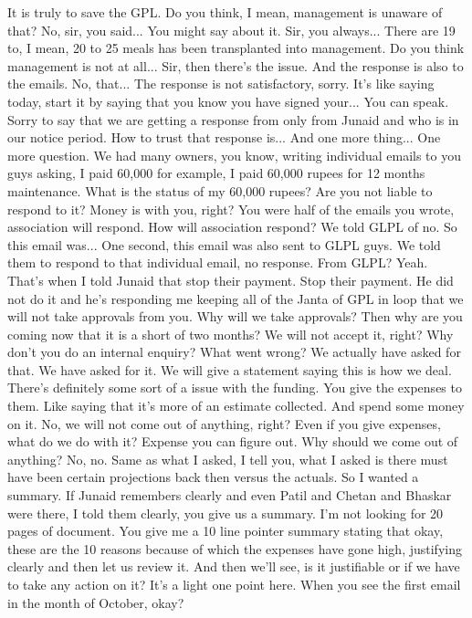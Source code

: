 It is truly to save the GPL.
Do you think, I mean, management is unaware of that?
No, sir, you said...
You might say about it.
Sir, you always...
There are 19 to, I mean, 20 to 25 meals has been transplanted into management.
Do you think management is not at all...
Sir, then there's the issue.
And the response is also to the emails.
No, that...
The response is not satisfactory, sorry.
It's like saying today, start it by saying that you know you have signed your...
You can speak.
Sorry to say that we are getting a response from only from Junaid and who is in our notice period.
How to trust that response is...
And one more thing...
One more question.
We had many owners, you know, writing individual emails to you guys asking,
I paid 60,000 for example, I paid 60,000 rupees for 12 months maintenance.
What is the status of my 60,000 rupees?
Are you not liable to respond to it?
Money is with you, right?
You were half of the emails you wrote, association will respond.
How will association respond?
We told GLPL of no.
So this email was...
One second, this email was also sent to GLPL guys.
We told them to respond to that individual email, no response.
From GLPL?
Yeah.
That's when I told Junaid that stop their payment.
Stop their payment.
He did not do it and he's responding me keeping all of the Janta of GPL in loop
that we will not take approvals from you.
Why will we take approvals?
Then why are you coming now that it is a short of two months?
We will not accept it, right?
Why don't you do an internal enquiry?
What went wrong?
We actually have asked for that.
We have asked for it.
We will give a statement saying this is how we deal.
There's definitely some sort of a issue with the funding.
You give the expenses to them.
Like saying that it's more of an estimate collected.
And spend some money on it.
No, we will not come out of anything, right?
Even if you give expenses, what do we do with it?
Expense you can figure out.
Why should we come out of anything?
No, no.
Same as what I asked, I tell you, what I asked is there must have been certain projections
back then versus the actuals.
So I wanted a summary.
If Junaid remembers clearly and even Patil and Chetan and Bhaskar were there,
I told them clearly, you give us a summary.
I'm not looking for 20 pages of document.
You give me a 10 line pointer summary stating that okay,
these are the 10 reasons because of which the expenses have gone high,
justifying clearly and then let us review it.
And then we'll see, is it justifiable or if we have to take any action on it?
It's a light one point here.
When you see the first email in the month of October, okay?
